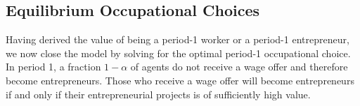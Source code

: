 \documentclass[12pt,american]{paper}
\theoremstyle{remark}
\begin{document}


\subsection{Equilibrium Occupational Choices}

Having derived the value of being a period-1 worker or a period-1 entrepreneur, we now close the model by solving for the optimal period-1 occupational choice. In period 1, a fraction  $1-\alpha$ of agents do not receive a wage offer and therefore become entrepreneurs. Those who receive a wage offer will become entrepreneurs if and only if their entrepreneurial projects is of sufficiently high value.
\end{document}
